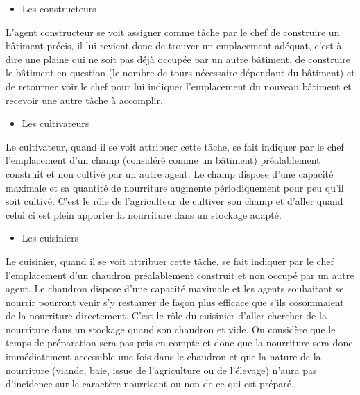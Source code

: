 \documentclass[12pt]{article}
\begin{document}
\begin{itemize}
		\begin{itemize}
		\item Les constructeurs\\
		\end{itemize}

L'agent constructeur se voit assigner comme tâche par le chef de construire un 
bâtiment précis, il lui revient donc de trouver un emplacement adéquat, c'est à
dire une plaine qui ne soit pas déjà occupée par un autre bâtiment, de 
construire le bâtiment en question (le nombre de tours nécessaire dépendant du 
bâtiment) et de retourner voir le chef pour lui indiquer l'emplacement du 
nouveau bâtiment et recevoir une autre tâche à accomplir.\\

		\begin{itemize}
		\item Les cultivateurs\\
		\end{itemize}

Le cultivateur, quand il se voit attribuer cette tâche, se fait indiquer par le 
chef l'emplacement d'un champ (considéré comme un bâtiment) préalablement 
construit et non cultivé par un autre agent. Le champ dispose d'une capacité 
maximale et sa quantité de nourriture augmente périodiquement pour peu qu'il 
soit cultivé. C'est le rôle de l'agriculteur de cultiver son champ et d'aller 
quand celui ci est plein apporter la nourriture dans un stockage adapté.\\

		\begin{itemize}
		\item Les cuisiniers\\
		\end{itemize}

Le cuisinier, quand il se voit attribuer cette tâche, se fait indiquer par le 
chef l'emplacement d'un chaudron préalablement construit et non occupé par 
un autre agent. Le chaudron dispose d'une capacité maximale et les agents 
souhaitant se nourrir pourront venir s'y restaurer de façon plus efficace que 
s'ils cosommaient de la nourriture directement. C'est le rôle du cuisinier 
d'aller chercher de la nourriture dans un stockage quand son chaudron et vide.
On considère que le temps de préparation sera pas pris en compte et donc que 
la nourriture sera donc immédiatement accessible une fois dans le chaudron et 
que la nature de la nourriture (viande, baie, issue de l'agriculture ou de 
l'élevage) n'aura pas d'incidence sur le caractère nourrisant ou non de ce qui 
est préparé.\\


\end{itemize}
\end{document}
